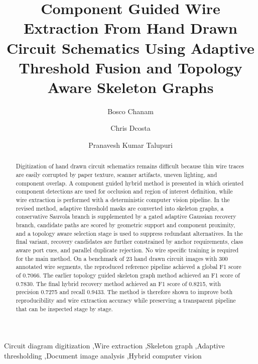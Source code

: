 \begin{frontmatter}

\title{Component Guided Wire Extraction From Hand Drawn Circuit Schematics Using Adaptive Threshold Fusion and Topology Aware Skeleton Graphs}

\author[scaai]{Bosco Chanam}

\author[scaai]{Chris Dcosta}

\author[usc]{Pranavesh Kumar Talupuri}


\address[scaai]{Symbiosis Centre for Applied Artificial Intelligence, Department of Computer Science and Engineering, Symbiosis Institute of Technology, Pune, India}
\address[usc]{Thomas Lord Department of Computer Science, University of Southern California, Los Angeles, California, United States}

\begin{abstract}
Digitization of hand drawn circuit schematics remains difficult because thin wire traces are easily corrupted by paper texture, scanner artifacts, uneven lighting, and component overlap. A component guided hybrid method is presented in which oriented component detections are used for occlusion and region of interest definition, while wire extraction is performed with a deterministic computer vision pipeline. In the revised method, adaptive threshold masks are converted into skeleton graphs, a conservative Sauvola branch is supplemented by a gated adaptive Gaussian recovery branch, candidate paths are scored by geometric support and component proximity, and a topology aware selection stage is used to suppress redundant alternatives. In the final variant, recovery candidates are further constrained by anchor requirements, class aware port cues, and parallel duplicate rejection. No wire specific training is required for the main method. On a benchmark of 23 hand drawn circuit images with 300 annotated wire segments, the reproduced reference pipeline achieved a global F1 score of 0.7066. The earlier topology guided skeleton graph method achieved an F1 score of 0.7830. The final hybrid recovery method achieved an F1 score of 0.8215, with precision 0.7275 and recall 0.9433. The method is therefore shown to improve both reproducibility and wire extraction accuracy while preserving a transparent pipeline that can be inspected stage by stage.
\end{abstract}

\begin{keyword}
Circuit diagram digitization \sep Wire extraction \sep Skeleton graph \sep Adaptive thresholding \sep Document image analysis \sep Hybrid computer vision
\end{keyword}

\end{frontmatter}

